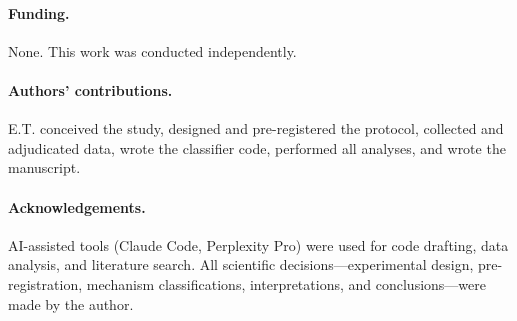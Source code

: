 \documentclass[11pt]{article}
\begin{document}
\paragraph{Funding.}
None. This work was conducted independently.

\paragraph{Authors' contributions.}
E.T. conceived the study, designed and pre-registered the protocol, collected and adjudicated data, wrote the classifier code, performed all analyses, and wrote the manuscript.

\paragraph{Acknowledgements.}
AI-assisted tools (Claude Code, Perplexity Pro) were used for code drafting, data analysis, and literature search. All scientific decisions---experimental design, pre-registration, mechanism classifications, interpretations, and conclusions---were made by the author.
\end{document}
